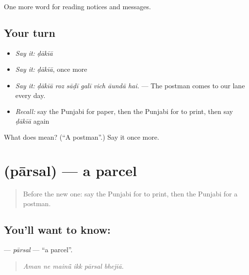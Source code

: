 \begin{grammarlens}[title={What you've built}]
One more word for reading notices and messages.
\end{grammarlens}

\subsection*{Your turn}
\begin{itemize}
\raggedright
  \item \emph{Say it:} \emph{ḍākīā}
  \item \emph{Say it:} \emph{ḍākīā}, once more
  \item \emph{Say it:} \emph{ḍākīā roz sāḍī galī vich āundā hai.} — The postman comes to our lane every day.
  \item \emph{Recall:} say the Punjabi for paper, then the Punjabi for to print, then say \emph{ḍākīā} again
\end{itemize}

\begin{tcolorbox}[breakable,colback=teal!4,colframe=teal!35!black,title={Before you move on}]
What does  mean? (\textquotedblleft{}A postman\textquotedblright{}.) Say it once more.
\end{tcolorbox}
\section[\texorpdfstring{\pa{ਪਾਰਸਲ} (pārsal)}{ਪਾਰਸਲ (pārsal)}]{ (pārsal) — a parcel}

\label{lesson:PA-C256-parsal}



\begin{quote}
Before the new one: say the Punjabi for to print, then the Punjabi for a postman.
\end{quote}

\subsection*{You'll want to know: }
\textbf{} — \emph{pārsal} — \textquotedblleft{}a parcel\textquotedblright{}.

\begin{quote}
     
\end{quote}

\begin{quote}
\emph{Aman ne mainū̃ ikk pārsal bhejiā.}
\end{quote}

